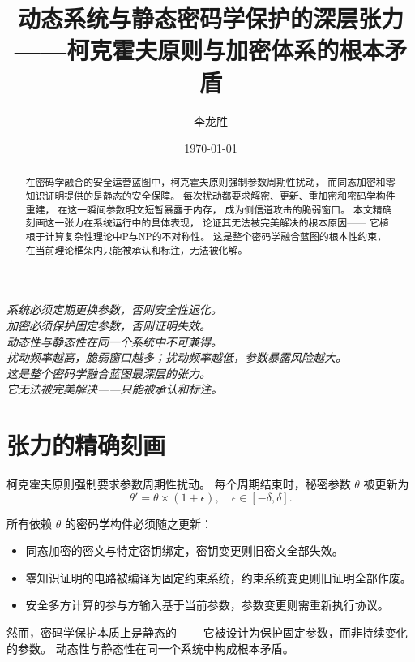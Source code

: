 \documentclass[11pt,a4paper]{article}
\title{动态系统与静态密码学保护的深层张力\\
——柯克霍夫原则与加密体系的根本矛盾}
\author{李龙胜}
\date{\today}
\begin{document}
\maketitle

\begin{center}
\textit{
系统必须定期更换参数，否则安全性退化。\\
加密必须保护固定参数，否则证明失效。\\
动态性与静态性在同一个系统中不可兼得。\\
扰动频率越高，脆弱窗口越多；扰动频率越低，参数暴露风险越大。\\
这是整个密码学融合蓝图最深层的张力。\\
它无法被完美解决——只能被承认和标注。
}
\end{center}

\vspace{5mm}

\begin{abstract}
在密码学融合的安全运营蓝图中，柯克霍夫原则强制参数周期性扰动，
而同态加密和零知识证明提供的是静态的安全保障。
每次扰动都要求解密、更新、重加密和密码学构件重建，
在这一瞬间参数明文短暂暴露于内存，
成为侧信道攻击的脆弱窗口。
本文精确刻画这一张力在系统运行中的具体表现，
论证其无法被完美解决的根本原因——
它植根于计算复杂性理论中P与NP的不对称性。
这是整个密码学融合蓝图的根本性约束，
在当前理论框架内只能被承认和标注，无法被化解。
\end{abstract}

\tableofcontents

\section{张力的精确刻画}

柯克霍夫原则强制要求参数周期性扰动。
每个周期结束时，秘密参数 \(\theta\) 被更新为
\[
\theta' = \theta \times (1 + \epsilon), \quad \epsilon \in [-\delta, \delta].
\]

所有依赖 \(\theta\) 的密码学构件必须随之更新：
\begin{itemize}
    \item 同态加密的密文与特定密钥绑定，密钥变更则旧密文全部失效。
    \item 零知识证明的电路被编译为固定约束系统，约束系统变更则旧证明全部作废。
    \item 安全多方计算的参与方输入基于当前参数，参数变更则需重新执行协议。
\end{itemize}

然而，密码学保护本质上是静态的——
它被设计为保护固定参数，而非持续变化的参数。
动态性与静态性在同一个系统中构成根本矛盾。
\end{document}
